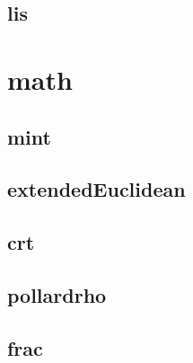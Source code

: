 \vspace{-2pt}
\subsection{lis}
\vspace{-5pt}
\raggedbottom
\hrulefill


\section{math}
\vspace{-2pt}
\subsection{mint}
\vspace{-5pt}
\raggedbottom
\hrulefill

\vspace{-2pt}
\subsection{extendedEuclidean}
\vspace{-5pt}
\raggedbottom
\hrulefill

\vspace{-2pt}
\subsection{crt}
\vspace{-5pt}
\raggedbottom
\hrulefill

\vspace{-2pt}
\subsection{pollardrho}
\vspace{-5pt}
\raggedbottom
\hrulefill

\vspace{-2pt}
\subsection{frac}
\vspace{-5pt}
\raggedbottom
\hrulefill

